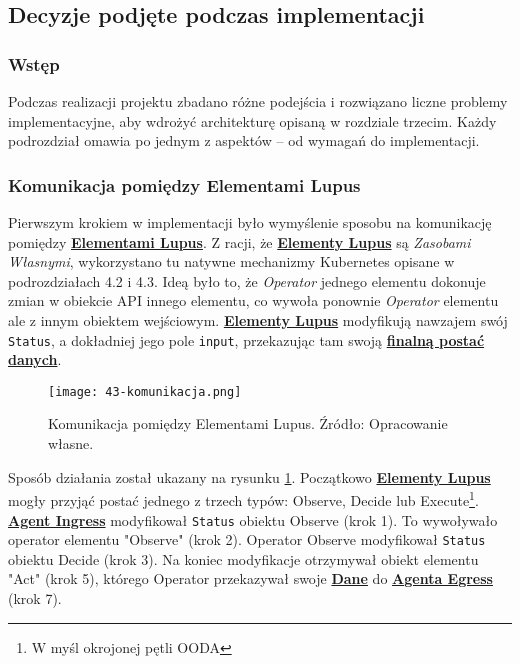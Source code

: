\subsection{Decyzje podjęte podczas implementacji}

\subsubsection{Wstęp}

Podczas realizacji projektu zbadano różne podejścia i rozwiązano liczne problemy implementacyjne, aby wdrożyć architekturę opisaną w rozdziale trzecim. Każdy podrozdział omawia po jednym z aspektów – od wymagań do implementacji.

\subsubsection{Komunikacja pomiędzy Elementami Lupus}

Pierwszym krokiem w implementacji było wymyślenie sposobu na komunikację pomiędzy \hyperlink{def:element-lupus}{\textbf{Elementami Lupus}}. Z racji, że \hyperlink{def:element-lupus}{\textbf{Elementy Lupus}} są \textit{Zasobami Własnymi}, wykorzystano tu natywne mechanizmy Kubernetes opisane w podrozdziałach 4.2 i 4.3. Ideą było to, że \textit{Operator} jednego elementu dokonuje zmian w obiekcie API innego elementu, co wywoła ponownie \textit{Operator} elementu ale z innym obiektem wejściowym. \hyperlink{def:element-lupus}{\textbf{Elementy Lupus}} modyfikują nawzajem swój \texttt{Status}, a dokładniej jego pole \texttt{input}, przekazując tam swoją \hyperlink{def:finalne-dane}{\textbf{finalną postać danych}}.

\begin{figure}[!h]
    \centering \texttt{[image: 43-komunikacja.png]}
    \caption{Komunikacja pomiędzy Elementami Lupus. Źródło: Opracowanie własne.}\label{fig:43-komunikacja}
\end{figure}

Sposób działania został ukazany na rysunku \ref{fig:43-komunikacja}. Początkowo \hyperlink{def:element-lupus}{\textbf{Elementy Lupus}} mogły przyjąć postać jednego z trzech typów: Observe, Decide lub Execute\footnote{W myśl okrojonej pętli OODA}. \hyperlink{def:agent-ingress}{\textbf{Agent Ingress}} modyfikował \texttt{Status} obiektu Observe (krok 1). To wywoływało operator elementu "Observe" (krok 2). Operator Observe modyfikował \texttt{Status} obiektu Decide (krok 3). Na koniec modyfikacje otrzymywał obiekt elementu "Act" (krok 5), którego Operator przekazywał swoje \hyperlink{def:dane}{\textbf{Dane}} do \hyperlink{def:agent-egress}{\textbf{Agenta Egress}} (krok 7). 

